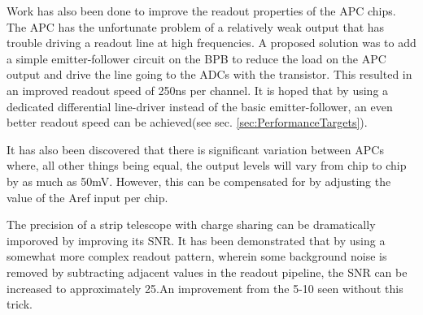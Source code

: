 \documentclass{article}
\begin{document}
Work has also been done to improve the readout properties of the \gls{APC} chips.\cite{Ryser2013} The \gls{APC} has the unfortunate problem of a relatively weak output that has trouble driving a readout line at high frequencies. A proposed solution was to add a simple emitter-follower circuit on the BPB to reduce the load on the \gls{APC} output and drive the line going to the ADCs with the transistor. This resulted in an improved readout speed of 250ns per channel. It is hoped that by using a dedicated differential line-driver instead of the basic emitter-follower, an even better readout speed can be achieved(see sec. \ref{sec:PerformanceTargets}). 

It has also been discovered that there is significant variation between APCs where, all other things being equal, the output levels will vary from chip to chip by as much as 50mV.\cite{Ryser2013} However, this can be compensated for by adjusting the value of the Aref input per chip.

The precision of a strip telescope with charge sharing can be dramatically imporoved by improving its \gls{SNR}. It has been demonstrated that by using a somewhat more complex readout pattern, wherein some background noise is removed by subtracting adjacent values in the readout pipeline, the \gls{SNR} can be increased to approximately 25.An improvement from the 5-10 seen without this trick.\cite{Ryser2013}
\end{document}
